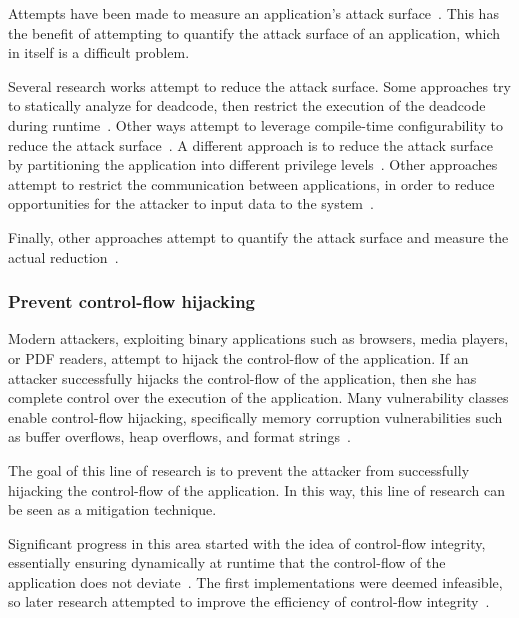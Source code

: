 \documentclass[11pt,letterpaper]{article}
\begin{document}
Attempts have been made to measure an application's attack
surface~\cite{howard2003, manadhata2007, manadhata2008, ruprecht2014}.
This has the benefit of attempting to quantify the attack surface of
an application, which in itself is a difficult problem.

Several research works attempt to reduce the attack surface. Some
approaches try to statically analyze for deadcode, then restrict the
execution of the deadcode during runtime~\cite{kurmus2011}. Other ways
attempt to leverage compile-time configurability to reduce the attack
surface~\cite{tartler2012, kurmus2013, ruprecht2014}. A different
approach is to reduce the attack surface by partitioning the
application into different privilege levels~\cite{barth2010, xu2012}.
Other approaches attempt to restrict the communication between
applications, in order to reduce opportunities for the attacker to
input data to the system~\cite{kantola2012}.

Finally, other approaches attempt to quantify the attack surface and
measure the actual reduction~\cite{kurmus2014}.

\subsubsection{Prevent control-flow hijacking}

Modern attackers, exploiting binary applications such as browsers,
media players, or PDF readers, attempt to hijack the control-flow of
the application. If an attacker successfully hijacks the control-flow
of the application, then she has complete control over the execution
of the application. Many vulnerability classes enable control-flow
hijacking, specifically memory corruption vulnerabilities such as
buffer overflows, heap overflows, and format strings~\cite{szekeres2013}.

The goal of this line of research is to prevent the attacker from
successfully hijacking the control-flow of the application. In this
way, this line of research can be seen as a mitigation technique.

Significant progress in this area started with the idea of
control-flow integrity, essentially ensuring dynamically at runtime
that the control-flow of the application does not
deviate~\cite{abadi2005, abadi2009}. The first implementations were
deemed infeasible, so later research attempted to improve the
efficiency of control-flow integrity~\cite{zhang2013, tice2014,
  bletsch2011, zhang2013, zhang2013a}.
\end{document}

